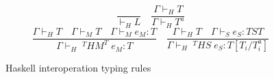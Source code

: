 \begin{figure}
\[
\frac{}{\vdash_{H}L}
\quad
\frac{\Gamma\vdash_{H}T}{\Gamma\vdash_{H}T^{a}}
\]
\bigskip
\[
\frac{\Gamma\vdash_{H}T\quad\Gamma\vdash_{M}T\quad\Gamma\vdash_{M}e_{M}:T}{\Gamma\vdash_{H}\;^{T}HM^{T}\;e_{M}:T}
\quad
\frac{\Gamma\vdash_{H}T\quad\Gamma\vdash_{S}e_{S}:TST}{\Gamma\vdash_{H}\;^{T}HS\;e_{S}:T[T_{i}/T^{a}_{i}]}
\]
\caption{Haskell interoperation typing rules}
\label{hitr}
\end{figure}